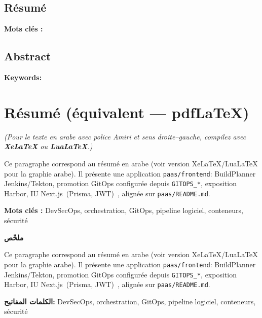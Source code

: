 \documentclass[a4paper,12pt]{report}
\renewcommand{\arabicabstract}{%
Ce paragraphe correspond au résumé en arabe (voir version XeLaTeX/LuaLaTeX pour la graphie arabe). Il présente une application \texttt{paas/frontend}: BuildPlanner Jenkins/Tekton, promotion GitOps configurée depuis \texttt{GITOPS\_*}, exposition Harbor, IU Next.js~(Prisma, JWT)~, alignée sur \texttt{paas/README.md}.%
}
\renewcommand{\arabickeywords}{%
DevSecOps, orchestration, GitOps, pipeline logiciel, conteneurs, sécurité%
}
\begin{document}
\newpage



\newpage
\thispagestyle{plain}   %
\setlength{\parindent}{0pt}   %
\setlength{\parskip}{0.8ex}

\begin{otherlanguage}{french}
    \section*{Résumé}
    \frenchabstract

    \vspace{0.5cm}
    \textbf{Mots clés :} \frenchkeywords
\end{otherlanguage}

\vspace{1cm}

\begin{otherlanguage}{english}
    \section*{Abstract}
    \englishabstract

    \vspace{0.5cm}
    \textbf{Keywords:} \englishkeywords
\end{otherlanguage}

\vspace{1cm}

\ifPDFTeX
    \section*{Résumé (équivalent — pdfLaTeX)}
    \small\textit{(Pour le texte en arabe avec police Amiri et sens droite--gauche, compilez avec \textbf{XeLaTeX} ou \textbf{LuaLaTeX}.)}
    \vspace{0.5em}

    \arabicabstract

    \vspace{0.5cm}
    \textbf{Mots clés :} \arabickeywords
\else
    \begin{otherlanguage}{arabic}
        \begin{center}
            {\arabicfont \Large \textbf{ملخّص}}
        \end{center}
        {\arabicfont \arabicabstract}

        \vspace{0.5cm}
        \textbf{\arabicfont الكلمات المفاتيح:} {\arabicfont \arabickeywords}
    \end{otherlanguage}
\fi
\end{document}
